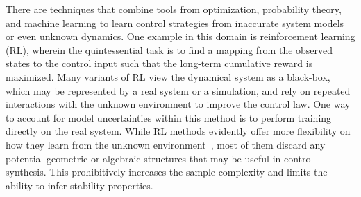 There are techniques that combine tools from optimization, probability theory,
and machine learning to learn control strategies from inaccurate system models
or even unknown dynamics.
%
%
%
One example in this domain is reinforcement learning (RL), wherein the quintessential
task is to find a mapping from the observed states to the control input such
that the long-term cumulative reward is maximized.
%
Many variants of RL view the dynamical system as a black-box, which may be
represented by a real system or a simulation, and rely on repeated interactions
with the unknown environment to improve the control law.
%
One way to account for model uncertainties within this method is to perform training
directly on the real system.
%
%
While RL methods evidently offer more flexibility on how they learn from the
unknown environment~\cite{heess2017emergence, andrychowicz2020learning,
lillicrap2015continuous}, most of them discard any potential geometric or
algebraic structures that may be useful in control synthesis.
%
This prohibitively increases the sample complexity and limits the ability to
infer stability properties.




